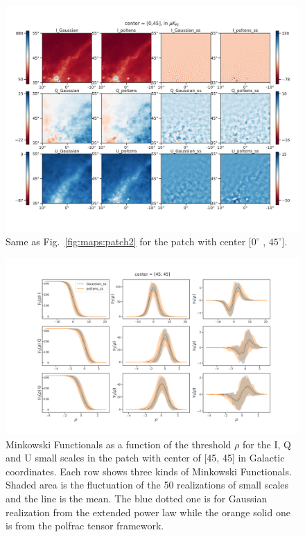 \documentclass[twocolumn]{aastex631}
\begin{document}
\begin{figure}[hbt]
    \centering
    \includegraphics[width=180mm]{maps_patch1.pdf}
    \caption{Same as Fig.~\ref{fig:maps:patch2} for the patch with center [$0^{\circ}$ , $45^{\circ} $].}
    \label{fig:maps:patch1}
\end{figure}

\begin{figure}[hbt]
    \centering
    \includegraphics[width=180mm]{center_45_45.pdf}
    \caption{Minkowski Functionals as a function of the threshold $\rho$ for the I, Q and U small scales in the patch with center of [45, 45] in Galactic coordinates. Each row shows three kinds of Minkowski Functionals. Shaded area is the fluctuation of the 50 realizations of small scales and the line is the mean. The blue dotted one is for Gaussian realization from the extended power law while the orange solid one is from the polfrac tensor framework. }
    \label{fig:MF:patch2}
\end{figure}
\end{document}
